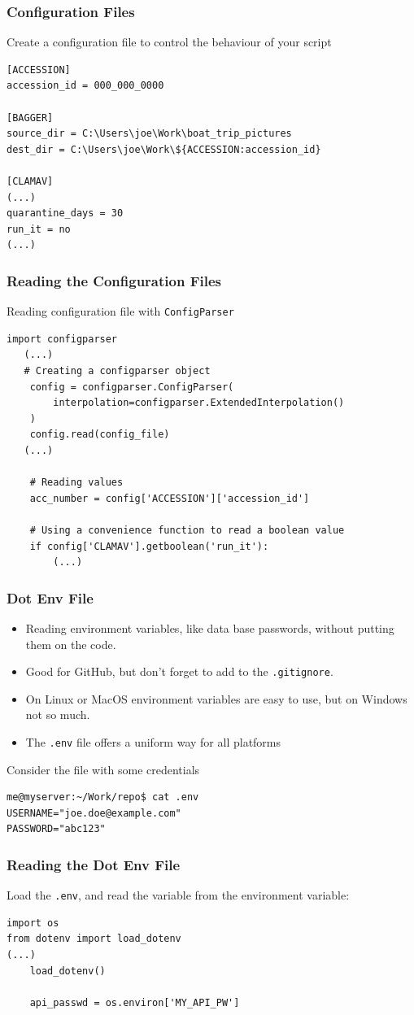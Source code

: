 \documentclass[aspectratio=169]{beamer}
\begin{document}
\begin{frame}[fragile]
\frametitle{Configuration Files}
Create a configuration file to control the behaviour of your script

\scriptsize
\begin{verbatim}
[ACCESSION]
accession_id = 000_000_0000

[BAGGER]
source_dir = C:\Users\joe\Work\boat_trip_pictures
dest_dir = C:\Users\joe\Work\${ACCESSION:accession_id}

[CLAMAV]
(...)
quarantine_days = 30
run_it = no
(...)
\end{verbatim}
\normalsize
\end{frame}

\begin{frame}[fragile]
\frametitle{Reading the Configuration Files}
Reading configuration file with \texttt{ConfigParser}

\scriptsize
\begin{verbatim}
import configparser
   (...)
   # Creating a configparser object
    config = configparser.ConfigParser(
        interpolation=configparser.ExtendedInterpolation()
    )
    config.read(config_file)
   (...)

    # Reading values
    acc_number = config['ACCESSION']['accession_id']

    # Using a convenience function to read a boolean value
    if config['CLAMAV'].getboolean('run_it'):
        (...)
\end{verbatim}
\normalsize
\end{frame}

\begin{frame}[fragile]
\frametitle{Dot Env File}
\begin{itemize}
    \item Reading environment variables, like data base passwords, without putting them on the code. 
    \item Good for GitHub, but don't forget to add to the \texttt{.gitignore}.
    \item On Linux or MacOS environment variables are easy to use, but on Windows not so much.
    \item The \texttt{.env} file offers a uniform way for all platforms
\end{itemize}

Consider the file with some credentials
\small
\begin{verbatim}
me@myserver:~/Work/repo$ cat .env
USERNAME="joe.doe@example.com"
PASSWORD="abc123"
\end{verbatim}
\normalsize
\end{frame}


\begin{frame}[fragile]
\frametitle{Reading the Dot Env File}

Load the \texttt{.env}, and read the variable from the environment variable:

\small
\begin{verbatim}
import os
from dotenv import load_dotenv
(...)
    load_dotenv()

    api_passwd = os.environ['MY_API_PW']
\end{verbatim}
\normalsize
\end{frame}


%
%
\end{document}
